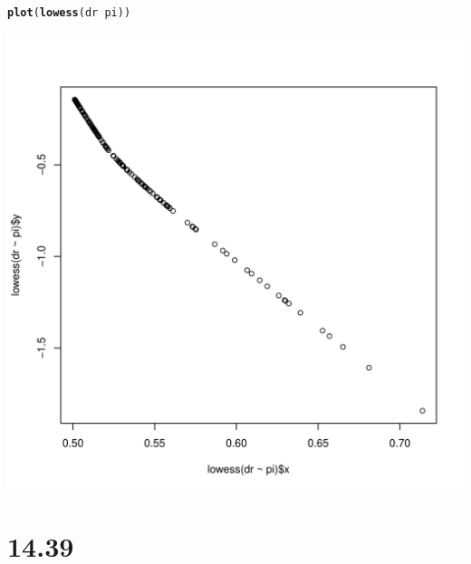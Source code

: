 \documentclass{article}\usepackage[]{graphicx}\usepackage[]{color}
\makeatletter
\def\maxwidth{ %
  \ifdim\Gin@nat@width>\linewidth
    \linewidth
  \else
    \Gin@nat@width
  \fi
}
\newcommand{\hlopt}[1]{\textcolor[rgb]{0,0,0}{#1}}%
\newcommand{\hlstd}[1]{\textcolor[rgb]{0.345,0.345,0.345}{#1}}%
\newcommand{\hlkwd}[1]{\textcolor[rgb]{0.737,0.353,0.396}{\textbf{#1}}}%
\newenvironment{kframe}{%
 \def\at@end@of@kframe{}%
 \ifinner\ifhmode%
  \def\at@end@of@kframe{\end{minipage}}%
  \begin{minipage}{\columnwidth}%
 \fi\fi%
 \def\FrameCommand##1{\hskip\@totalleftmargin \hskip-\fboxsep
 \colorbox{shadecolor}{##1}\hskip-\fboxsep
     \hskip-\linewidth \hskip-\@totalleftmargin \hskip\columnwidth}%
 \MakeFramed {\advance\hsize-\width
   \@totalleftmargin\z@ \linewidth\hsize
   \@setminipage}}%
 {\par\unskip\endMakeFramed%
 \at@end@of@kframe}
\newenvironment{knitrout}{}{} %
\makeatother
\begin{document}
\begin{enumerate}[(a)]
\begin{knitrout}
\begin{kframe}
\begin{alltt}
  \hlkwd{plot}\hlstd{(}\hlkwd{lowess}\hlstd{(dr} \hlopt{~} \hlstd{pi))}
\end{alltt}
\end{kframe}
\includegraphics[width=\maxwidth]{figure/unnamed-chunk-3-1} 

\end{knitrout}

\qquad

\end{enumerate}

\section{14.39}
\end{document}
